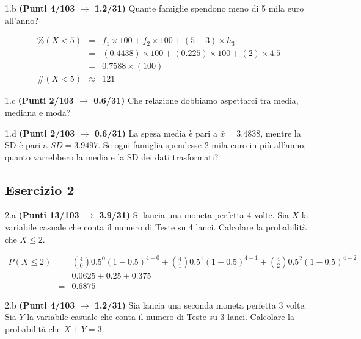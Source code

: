 \documentclass[
  11pt,
]{book}
\theoremstyle{mytheoremstyle}
\theoremstyle{mydefstyle}
\newenvironment{sol}
  {
  \begin{tcolorbox}[enhanced,breakable,arc=0.1mm,boxrule=1pt,colback=white,colframe=iblue,
  title=\bf \fontfamily{lmss}\selectfont \hspace{.5 cm} Soluzione,drop fuzzy shadow]

}{
\end{tcolorbox}
  }
\begin{document}
1.b \textbf{(Punti 4/103 \(\rightarrow\) 1.2/31)} Quante famiglie spendono meno di 5 mila euro all'anno?

\begin{sol}
\begin{eqnarray*}
     \%(X< 5 ) &=&  f_{ 1 }\times 100+f_{ 2 }\times 100 +( 5 - 3 )\times h_{ 3 } \\
              &=&  ( 0.4438 )\times 100+( 0.225 )\times 100 +( 2 )\times  4.5  \\
              &=&  0.7588 \times(100) \\
     \#(X< 5 ) &\approx& 121 
         \end{eqnarray*}

\end{sol}

1.c \textbf{(Punti 2/103 \(\rightarrow\) 0.6/31)} Che relazione dobbiamo aspettarci tra media, mediana e moda?

1.d \textbf{(Punti 2/103 \(\rightarrow\) 0.6/31)} La spesa media è pari a \(\bar x=3.4838\), mentre la SD è pari a \(SD=3.9497\).
Se ogni famiglia spendesse 2 mila euro in più all'anno, quanto varrebbero la media e la SD dei dati trasformati?

\subsection{Esercizio 2}\label{esercizio-2-34}

2.a \textbf{(Punti 13/103 \(\rightarrow\) 3.9/31)} Si lancia una moneta perfetta 4 volte. Sia \(X\) la variabile casuale che conta il numero di Teste su 4 lanci. Calcolare la probabilità che \(X\leq 2\).

\begin{sol}
\normalsize 
\begin{eqnarray*}
      P( X \leq 2 ) &=& \binom{ 4 }{ 0 } 0.5 ^{ 0 }(1- 0.5 )^{ 4 - 0 }+\binom{ 4 }{ 1 } 0.5 ^{ 1 }(1- 0.5 )^{ 4 - 1 }+\binom{ 4 }{ 2 } 0.5 ^{ 2 }(1- 0.5 )^{ 4 - 2 } \\                 &=& 0.0625+0.25+0.375 \\                 &=& 0.6875 
   \end{eqnarray*}
\normalsize 

\end{sol}

2.b \textbf{(Punti 4/103 \(\rightarrow\) 1.2/31)} Sia lancia una seconda moneta perfetta 3 volte. Sia \(Y\) la variabile casuale che conta il numero di Teste su 3 lanci. Calcolare la probabilità che \(X+Y=3\).
\end{document}

